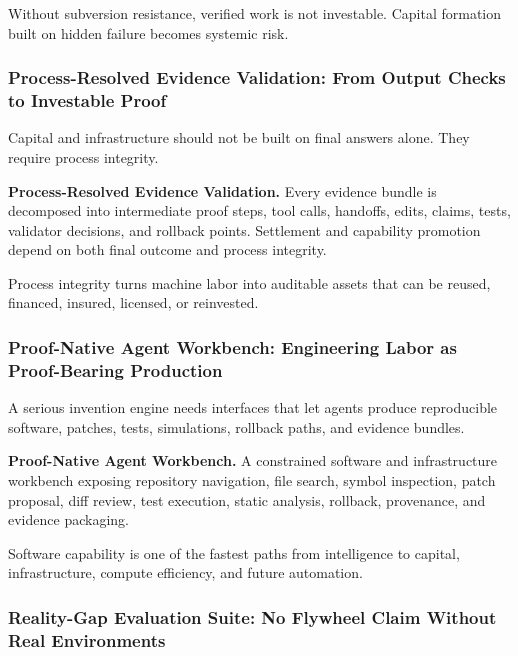 Without subversion resistance, verified work is not investable. Capital
formation built on hidden failure becomes systemic risk.

\subsubsection{Process-Resolved Evidence Validation: From Output Checks
to Investable
Proof}\label{process-resolved-evidence-validation-from-output-checks-to-investable-proof}

Capital and infrastructure should not be built on final answers alone.
They require process integrity.

\textbf{Process-Resolved Evidence Validation.} Every evidence bundle is
decomposed into intermediate proof steps, tool calls, handoffs, edits,
claims, tests, validator decisions, and rollback points. Settlement and
capability promotion depend on both final outcome and process integrity.

Process integrity turns machine labor into auditable assets that can be
reused, financed, insured, licensed, or reinvested.

\subsubsection{Proof-Native Agent Workbench: Engineering Labor as
Proof-Bearing
Production}\label{proof-native-agent-workbench-engineering-labor-as-proof-bearing-production}

A serious invention engine needs interfaces that let agents produce
reproducible software, patches, tests, simulations, rollback paths, and
evidence bundles.

\textbf{Proof-Native Agent Workbench.} A constrained software and
infrastructure workbench exposing repository navigation, file search,
symbol inspection, patch proposal, diff review, test execution, static
analysis, rollback, provenance, and evidence packaging.

Software capability is one of the fastest paths from intelligence to
capital, infrastructure, compute efficiency, and future automation.

\subsubsection{Reality-Gap Evaluation Suite: No Flywheel Claim Without
Real
Environments}\label{reality-gap-evaluation-suite-no-flywheel-claim-without-real-environments}

